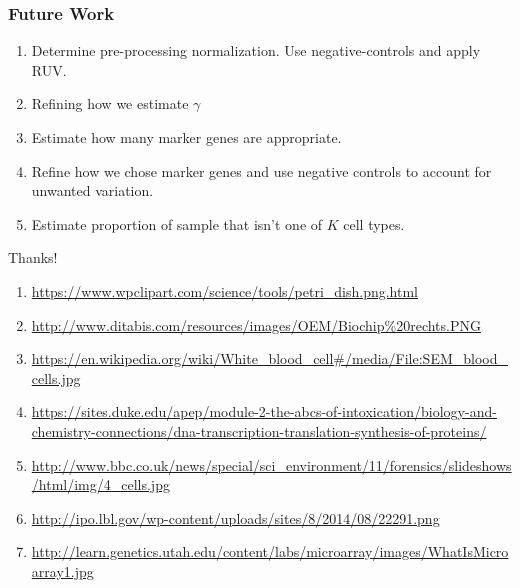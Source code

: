 \documentclass{beamer}
\begin{document}
\begin{frame}
  \frametitle{Future Work}
  \begin{enumerate}
  \item Determine pre-processing normalization. Use negative-controls and apply RUV. 
  \item Refining how we estimate $\gamma$
  \item Estimate how many marker genes are appropriate. 
  \item Refine how we chose marker genes and use negative controls to account for unwanted variation.
  \item Estimate proportion of sample that isn't one of $K$ cell types.
  \end{enumerate}
\end{frame}

\begin{frame}

  \begin{center}
    {\Large Thanks!}
  \end{center}
\end{frame}

\begin{frame}
  \begin{enumerate}
    \item \url{https://www.wpclipart.com/science/tools/petri_dish.png.html}
    \item \url{http://www.ditabis.com/resources/images/OEM/Biochip\%20rechts.PNG}
    \item \url{https://en.wikipedia.org/wiki/White_blood_cell\#/media/File:SEM_blood_cells.jpg}
    \item \url{https://sites.duke.edu/apep/module-2-the-abcs-of-intoxication/biology-and-chemistry-connections/dna-transcription-translation-synthesis-of-proteins/}
    \item \url{http://www.bbc.co.uk/news/special/sci_environment/11/forensics/slideshows/html/img/4_cells.jpg}
    \item \url{http://ipo.lbl.gov/wp-content/uploads/sites/8/2014/08/22291.png}
    \item \url{http://learn.genetics.utah.edu/content/labs/microarray/images/WhatIsMicroarray1.jpg}
 \end{enumerate}
\end{frame}
\end{document}
